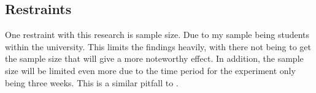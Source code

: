 \documentclass[conference]{IEEEtran}
\begin{document}
\subsection {Restraints}
One restraint with this research is sample size. Due to my sample being students within the university. This limits the findings heavily, with there not being to get the sample size that will give a more noteworthy effect. In addition, the sample size will be limited even more due to the time period for the experiment only being three weeks. This is a similar pitfall to \cite{Naaj2021}.\\







\end{document}
